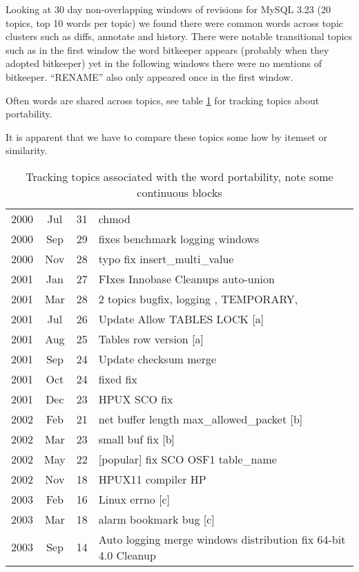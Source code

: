 \documentclass{report}
\begin{document}

Looking at 30 day non-overlapping windows of revisions for MySQL 3.23
(20 topics, top 10 words per topic) we found there were common words
across topic clusters such as diffs, annotate and history. There were
notable transitional topics such as in the first window the word
bitkeeper appears (probably when they adopted bitkeeper) yet in the
following windows there were no mentions of bitkeeper. ``RENAME'' also
only appeared once in the first window.

Often words are shared across topics, see table \ref{tab:portability}
for tracking topics about portability.

It is apparent that we have to compare these topics some how by
itemset or similarity.

\begin{table}
\centering
\begin{tabular}{|ccc|l|}
\hline
2000 &  Jul &  31 &    chmod \\
2000 &  Sep &  29 &    fixes benchmark logging windows \\
2000 &  Nov &  28 &    typo fix insert\_multi\_value \\
2001 &  Jan &  27 &    FIxes Innobase Cleanups auto-union \\
2001 &  Mar &  28 &    2 topics bugfix, logging , TEMPORARY,  \\
\hline
2001 &  Jul &  26 &    Update Allow TABLES LOCK [a] \\ 

2001 &  Aug &  25 &    Tables row version [a] \\
\hline
2001 &  Sep &  24 &    Update checksum merge \\
2001 &  Oct &  24 &    fixed fix \\
2001 &  Dec &  23 &    HPUX SCO fix \\
\hline
2002 &  Feb &  21 &    net buffer length  max\_allowed\_packet [b] \\
2002 &  Mar &  23 &    small buf fix [b]  \\
\hline
2002 &  May &  22 &    [popular] fix SCO OSF1 table\_name \\
2002 &  Nov &  18 &    HPUX11 compiler HP \\
\hline
2003 &  Feb &  16 &    Linux errno  [c] \\
2003 &  Mar &  18 &    alarm bookmark bug [c] \\
\hline
2003 &  Sep &  14 &    Auto logging merge windows distribution fix 64-bit 4.0 Cleanup \\
\hline
\end{tabular}
\caption{Tracking topics associated with the word portability, note some continuous blocks}
\label{tab:portability}
\end{table}
\end{document}
